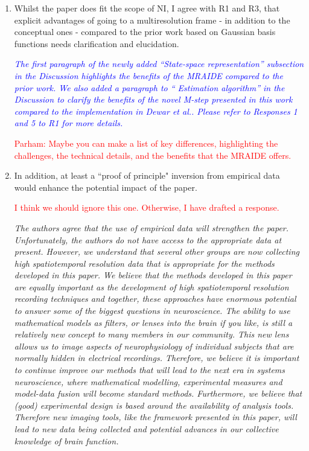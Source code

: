 \documentclass{article}
\newcommand{\dean}[1]{\textcolor{red}{#1}}
\newcommand{\parham}[1]{\textcolor{blue}{#1}}
\begin{document}
\begin{enumerate}
\item Whilst the paper does fit the scope of NI, I agree with R1 and R3, that explicit advantages of going to a multiresolution frame - in addition to the conceptual ones - compared to the prior work based on Gaussian basis functions needs clarification and elucidation.
 
\emph{\parham{The first paragraph of the newly added ``State-space representation'' subsection in the Discussion  highlights the benefits of the MRAIDE compared to the prior work. We also added a paragraph to `` Estimation algorithm'' in the Discussion to clarify the benefits of the novel M-step presented in this work compared to the implementation in Dewar et al.. Please refer to Responses 1 and 5 to R1 for more details.}}


\dean{Parham: Maybe you can make a list of key differences, highlighting the challenges, the technical details, and the benefits that the MRAIDE offers.}

\item  In addition, at least a ``proof of principle" inversion from empirical data would enhance the potential impact of the paper. 

\dean{I think we should ignore this one. Otherwise, I have drafted a response.}


\emph{The authors agree that the use of empirical data will strengthen the paper. Unfortunately, the authors do not have access to the appropriate data at present. However, we understand that several other groups are now collecting high spatiotemporal resolution data that is appropriate for the methods developed in this paper. We believe that the methods developed in this paper are equally important as the development of high spatiotemporal resolution recording techniques and together, these approaches have enormous potential to answer some of the biggest questions in neuroscience. The ability to use mathematical models as filters, or lenses into the brain if you like, is still a relatively new concept to many members in our community. This new lens allows us to image aspects of neurophysiology of individual subjects that are normally hidden in electrical recordings. Therefore, we believe it is important to continue improve our methods that will lead to the next era in systems neuroscience, where mathematical modelling, experimental measures and model-data fusion will become standard methods. Furthermore, we believe that (good) experimental design is based around the availability of analysis tools. Therefore new imaging tools, like the framework presented in this paper, will lead to new data being collected and potential advances in our collective knowledge of brain function. } 
	
\end{enumerate}
\end{document}
